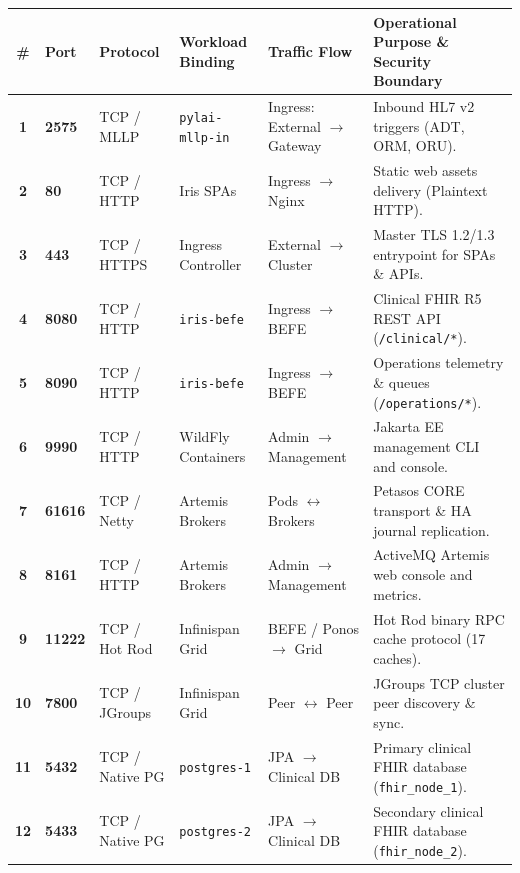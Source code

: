 \begin{table}[htbp]
\centering
\scriptsize
\begin{tabularx}{\textwidth}{c l P{2.2cm} P{2.8cm} P{2.6cm} Y}
\toprule
\textbf{\#} & \textbf{Port} & \textbf{Protocol} & \textbf{Workload Binding} & \textbf{Traffic Flow} & \textbf{Operational Purpose \& Security Boundary} \\
\midrule
\textbf{1} & \textbf{2575} & TCP / MLLP & \nolinkurl{pylai-mllp-in} & Ingress: External $\rightarrow$ Gateway & Inbound HL7 v2 triggers (ADT, ORM, ORU). \\
\textbf{2} & \textbf{80} & TCP / HTTP & Iris SPAs & Ingress $\rightarrow$ Nginx & Static web assets delivery (Plaintext HTTP). \\
\textbf{3} & \textbf{443} & TCP / HTTPS & Ingress Controller & External $\rightarrow$ Cluster & Master TLS 1.2/1.3 entrypoint for SPAs \& APIs. \\
\textbf{4} & \textbf{8080} & TCP / HTTP & \nolinkurl{iris-befe} & Ingress $\rightarrow$ BEFE & Clinical FHIR R5 REST API (\nolinkurl{/clinical/*}). \\
\textbf{5} & \textbf{8090} & TCP / HTTP & \nolinkurl{iris-befe} & Ingress $\rightarrow$ BEFE & Operations telemetry \& queues (\nolinkurl{/operations/*}). \\
\textbf{6} & \textbf{9990} & TCP / HTTP & WildFly Containers & Admin $\rightarrow$ Management & Jakarta EE management CLI and console. \\
\textbf{7} & \textbf{61616} & TCP / Netty & Artemis Brokers & Pods $\leftrightarrow$ Brokers & Petasos CORE transport \& HA journal replication. \\
\textbf{8} & \textbf{8161} & TCP / HTTP & Artemis Brokers & Admin $\rightarrow$ Management & ActiveMQ Artemis web console and metrics. \\
\textbf{9} & \textbf{11222} & TCP / Hot Rod & Infinispan Grid & BEFE / Ponos $\rightarrow$ Grid & Hot Rod binary RPC cache protocol (17 caches). \\
\textbf{10} & \textbf{7800} & TCP / JGroups & Infinispan Grid & Peer $\leftrightarrow$ Peer & JGroups TCP cluster peer discovery \& sync. \\
\textbf{11} & \textbf{5432} & TCP / Native PG & \nolinkurl{postgres-1} & JPA $\rightarrow$ Clinical DB & Primary clinical FHIR database (\nolinkurl{fhir_node_1}). \\
\textbf{12} & \textbf{5433} & TCP / Native PG & \nolinkurl{postgres-2} & JPA $\rightarrow$ Clinical DB & Secondary clinical FHIR database (\nolinkurl{fhir_node_2}). \\

\end{tabularx}
\end{table}
